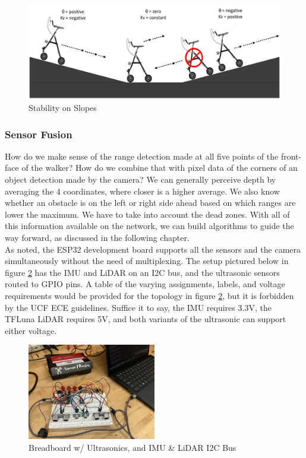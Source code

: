 \begin{figure}[H]
	\centering
	\includegraphics[width=\textwidth]{./Images/Incline-Decline-Stability.png}
	\caption{\label{fig:slope-stability}Stability on Slopes}
\end{figure}

\subsubsection{Sensor Fusion}
\noindent How do we make sense of the range detection made at all five points of the front-face of the walker? How do we combine that with pixel data of the corners of an object detection made by the camera? We can generally perceive depth by averaging the 4 coordinates, where closer is a higher average. We also know whether an obstacle is on the left or right side ahead based on which ranges are lower the maximum. We have to take into account the dead zones. With all of this information available on the network, we can build algorithms to guide the way forward, as discussed in the following chapter.\\

\noindent As noted, the ESP32 development board supports all the sensors and the camera simultaneously without the need of multiplexing. The setup pictured below in figure \ref{fig:bb-test} has the IMU and LiDAR on an I2C bus, and the ultrasonic sensors routed to GPIO pins. A table of the varying assignments, labels, and voltage requirements would be provided for the topology in figure \ref{fig:bb-test}, but it is forbidden by the UCF ECE guidelines. Suffice it to say, the IMU requires 3.3V, the TFLuna LiDAR requires 5V, and both variants of the ultrasonic can support either voltage.\\
\begin{figure}[H]
	\centering
	\includegraphics[width=0.5\textwidth]{./Images/breadboard-test.jpg}
	\caption{\label{fig:bb-test}Breadboard w/ Ultrasonics, and IMU \& LiDAR I2C Bus}
\end{figure}

